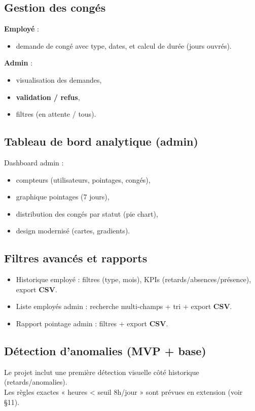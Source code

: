 \documentclass[12pt,a4paper]{article}
\begin{document}
\subsection{Gestion des congés}
\textbf{Employé} :
\begin{itemize}[leftmargin=*]
  \item demande de congé avec type, dates, et calcul de durée (jours ouvrés).
\end{itemize}

\textbf{Admin} :
\begin{itemize}[leftmargin=*]
  \item visualisation des demandes,
  \item \textbf{validation / refus},
  \item filtres (en attente / tous).
\end{itemize}

\subsection{Tableau de bord analytique (admin)}
Dashboard admin :
\begin{itemize}[leftmargin=*]
  \item compteurs (utilisateurs, pointages, congés),
  \item graphique pointages (7 jours),
  \item distribution des congés par statut (pie chart),
  \item design modernisé (cartes, gradients).
\end{itemize}

\subsection{Filtres avancés et rapports}
\begin{itemize}[leftmargin=*]
  \item Historique employé : filtres (type, mois), KPIs (retards/absences/présence), export \textbf{CSV}.
  \item Liste employés admin : recherche multi-champs + tri + export \textbf{CSV}.
  \item Rapport pointage admin : filtres + export \textbf{CSV}.
\end{itemize}

\subsection{Détection d’anomalies (MVP + base)}
Le projet inclut une première détection visuelle côté historique (retards/anomalies).\\
Les règles exactes « heures < seuil 8h/jour » sont prévues en extension (voir \S 11).
\end{document}
